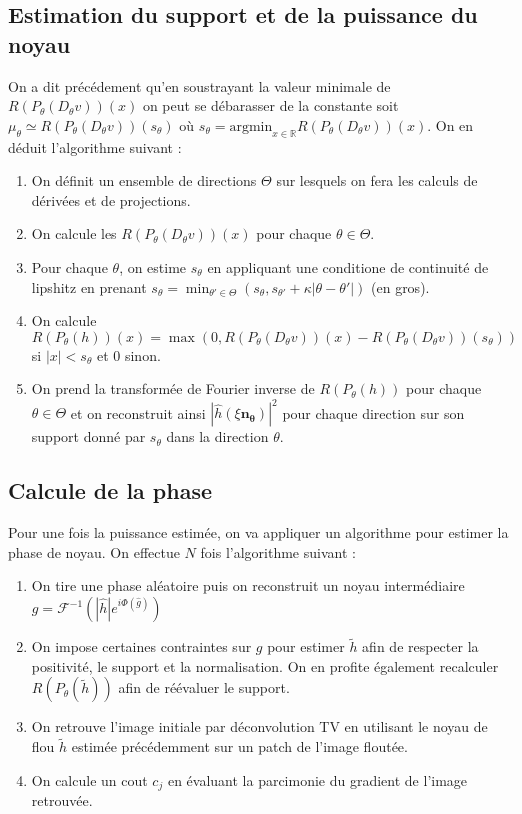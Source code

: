 \documentclass[a4paper,11pt]{article}
\begin{document}
\subsection{Estimation du support et de la puissance du noyau}
On a dit précédement qu'en soustrayant la valeur minimale de $R(P_{\theta}(D_{\theta}v))(x)$ on peut se débarasser de la constante soit $\mu_{\theta} \simeq R(P_{\theta}(D_{\theta}v))(s_{\theta})$ où $s_{\theta}= \text{argmin}_{x\in \mathbb{R}}R(P_{\theta}(D_{\theta}v))(x)$. On en déduit l'algorithme suivant : 
\begin{enumerate}
\item On définit un ensemble de directions $\Theta$ sur lesquels on fera les calculs de dérivées et de projections.
\item On calcule les $R(P_{\theta}(D_{\theta}v))(x)$ pour chaque $\theta \in \Theta$.
\item Pour chaque $\theta$, on estime $s_{\theta}$ en appliquant une conditione de continuité de lipshitz en prenant $s_{\theta}= \min_{\theta'\in \Theta}(s_{\theta},s_{\theta'} +\kappa |\theta-\theta'|)$ (en gros).
\item On calcule $R(P_{\theta}(h))(x) = \max(0,R(P_{\theta}(D_{\theta}v))(x) - R(P_{\theta}(D_{\theta}v))(s_{\theta})) $ si $|x|<s_{\theta}$ et 0 sinon.
\item On prend la transformée de Fourier inverse de $R(P_{\theta}(h))$ pour chaque $\theta\in \Theta$ et on reconstruit ainsi $|\hat{h}(\xi\bm{n_{\theta}})|^2$ pour chaque direction sur son support donné par $s_{\theta}$ dans la direction $\theta$.
\end{enumerate}

\subsection{Calcule de la phase}

Pour une fois la puissance estimée, on va appliquer un algorithme pour estimer la phase de noyau. On effectue $N$ fois l'algorithme suivant :
\begin{enumerate}
\item On tire une phase aléatoire puis on reconstruit un noyau intermédiaire $g = \mathcal{F}^{-1}(|\hat{h}|e^{i\Phi(\hat{g})})$
\item On impose certaines contraintes sur $g$ pour estimer $\tilde{h}$ afin de respecter la positivité, le support et la normalisation. On en profite également recalculer $R(P_{\theta}(\tilde{h}))$ afin de réévaluer le support.
\item On retrouve l'image initiale par déconvolution TV en utilisant le noyau de flou $\tilde{h}$ estimée précédemment sur un patch de l'image floutée.
\item On calcule un cout $c_j$ en évaluant la parcimonie du gradient de l'image retrouvée.
\end{enumerate}
\end{document}
